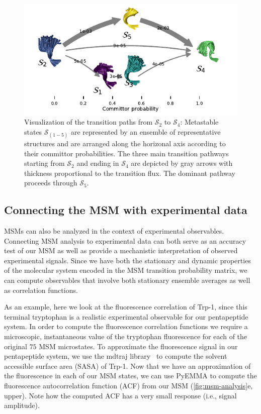 \documentclass[9pt,tutorial]{livecoms}
\begin{document}
\begin{figure}
\includegraphics{figure_4}
\caption{Visualization of the transition paths from $\mathcal{S}_2$ to $\mathcal{S}_4$:
Metastable states $\mathcal{S}_{(1-5)}$ are represented by an ensemble of representative structures and are arranged along the horizonal axis according to their committor probabilities. The three main transition pathways starting from $\mathcal{S}_2$ and ending in $\mathcal{S}_4$ are depicted by gray arrows with thickness proportional to the transition flux. The dominant pathway proceeds through $\mathcal{S}_5$.}
\label{fig:tpt-network}
\end{figure}

\subsection{Connecting the MSM with experimental data}
MSMs can also be analyzed in the context of experimental observables. Connecting MSM analysis to experimental data can both serve as an accuracy test of our MSM as well as provide a mechanistic interpretation of observed experimental signals.
Since we have both the stationary and dynamic properties of the molecular system encoded in the MSM transition probability matrix, we can compute observables that involve both stationary ensemble averages as well as correlation functions.

As an example, here we look at the fluorescence correlation of Trp-1, since this terminal tryptophan is a realistic experimental observable for our pentapeptide system.
In order to compute the fluorescence correlation functions we require a microscopic, instantaneous value of the tryptophan fluorescence for each of the original $75$ MSM microstates.
To approximate the fluorescence signal in our pentapeptide system, we use the mdtraj library~\cite{mdtraj} to compute the solvent accessible surface area (SASA) of Trp-1.
Now that we have an approximation of the fluorescence in each of our MSM states, we can use PyEMMA to compute the fluorescence autocorrelation function (ACF) from our MSM (\ref{fig:msm-analysis}e, upper).
Note how the computed ACF has a very small response (i.e., signal amplitude).
\end{document}
